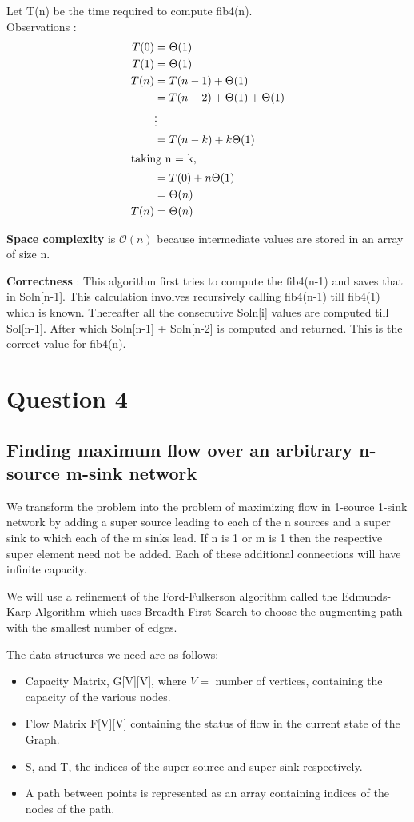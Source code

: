\documentclass{article}
\begin{document}
Let T(n) be the time required to compute fib4(n). \\
Observations : \\
\begin{align*}
T(0) & = \Theta(1) \\
T(1) & = \Theta(1) \\
T(n) & = T(n-1) + \Theta(1) \\
& = T(n-2) + \Theta(1) + \Theta(1) \\
& \vdots \\
& = T(n-k) + k\Theta(1) \\
\intertext{taking n = k,}
& = T(0) + n\Theta(1) \\
& = \Theta(n) \\
T(n) & = \Theta(n)\\
\end{align*}

\textbf{Space complexity} is $\mathcal{O}(n)$ because intermediate values are stored in an array of size n.

\textbf{Correctness} : This algorithm first tries to compute the fib4(n-1) and saves that in Soln[n-1]. This calculation involves recursively calling fib4(n-1) till fib4(1) which is known. Thereafter all the consecutive Soln[i] values are computed till Sol[n-1]. After which Soln[n-1] + Soln[n-2] is computed and returned. This is the correct value for fib4(n).

\newpage
\section{Question 4}
\subsection{Finding maximum flow over an arbitrary n-source m-sink network}
We transform the problem into the problem of maximizing flow in 1-source 1-sink  network by adding a super source leading to each of the n sources and a super sink to which each of the m sinks lead. If n is 1 or m is 1 then the respective super element need not be added. Each of these additional connections will have infinite capacity.

We will use a refinement of the Ford-Fulkerson algorithm called the Edmunds-Karp Algorithm which uses Breadth-First Search to choose the augmenting path with the smallest number of edges.

The data structures we need are as follows:-
\begin{itemize}
\item Capacity Matrix, G[V][V], where $V = $ number of vertices, containing the capacity of the various nodes.
\item Flow Matrix F[V][V] containing the status of flow in the current state of the Graph.
\item S, and T, the indices of the super-source and super-sink respectively.
\item A path between points is represented as an array containing indices of the nodes of the path. 
\end{itemize}
\end{document}
